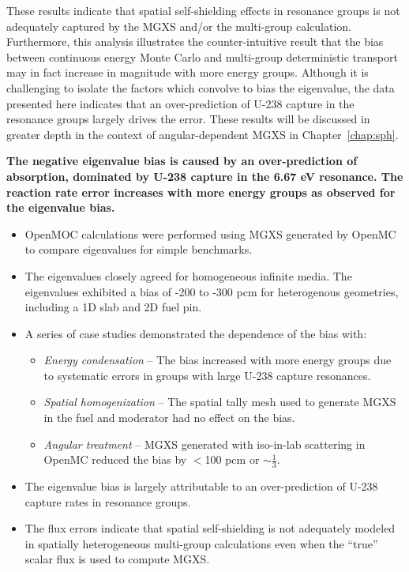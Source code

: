These results indicate that spatial self-shielding effects in resonance groups is not adequately captured by the \ac{MGXS} and/or the multi-group calculation. Furthermore, this analysis illustrates the counter-intuitive result that the bias between continuous energy Monte Carlo and multi-group deterministic transport may in fact increase in magnitude with more energy groups. Although it is challenging to isolate the factors which convolve to bias the eigenvalue, the data presented here indicates that an over-prediction of U-238 capture in the resonance groups largely drives the error. These results will be discussed in greater depth in the context of angular-dependent \ac{MGXS} in Chapter~\ref{chap:sph}.

\begin{emphbox}
\textbf{The negative eigenvalue bias is caused by an over-prediction of absorption, dominated by U-238 capture in the 6.67 eV resonance. The reaction rate error increases with more energy groups as observed for the eigenvalue bias.}
\end{emphbox}

\clearpage

\vfill
\begin{highlightsbox}[frametitle=Highlights]
\begin{itemize}
  \item OpenMOC calculations were performed using \ac{MGXS} generated by OpenMC to compare eigenvalues for simple benchmarks.
  \item The eigenvalues closely agreed for homogeneous infinite media. The eigenvalues exhibited a bias of -200 to -300 \ac{pcm} for heterogenous geometries, including a 1D slab and 2D fuel pin.
  \item A series of case studies demonstrated the dependence of the bias with:
  \begin{itemize}
    \item \textit{Energy condensation} -- The bias increased with more energy groups due to systematic errors in groups with large U-238 capture resonances.
    \item \textit{Spatial homogenization} -- The spatial tally mesh used to generate \ac{MGXS} in the fuel and moderator had no effect on the bias.
    \item \textit{Angular treatment} -- \ac{MGXS} generated with iso-in-lab scattering in OpenMC reduced the bias by $<$100 \ac{pcm} or $\sim\frac{1}{3}$.
  \end{itemize} 
  \item The eigenvalue bias is largely attributable to an over-prediction of U-238 capture rates in resonance groups.
  \item The flux errors indicate that spatial self-shielding is not adequately modeled in spatially heterogeneous multi-group calculations even when the ``true'' scalar flux is used to compute \ac{MGXS}.
\end{itemize}
\end{highlightsbox}
\vfill